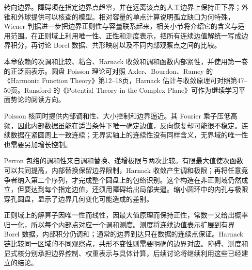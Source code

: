 \ProseParagraphBreak
{}转向边界。障碍须在指定边界点趋零，并在远离该点的人工边界上保持正下界；外锥和外球提供可以核查的模型。相对容量的单点计算说明孤立缺口为何特殊，Wiener 判据进一步把边界正则性与容量联系起来，相关小节将介绍它的含义与适用范围。在正则域上利用唯一性、正性和测度表示，把所有连续边值解统一写成边界积分，再讨论 Borel 数据、共形映射以及不同内部观察点之间的比较。

\ProseParagraphBreak
本章依赖的次调和比较、粘合、Harnack 收敛和调和函数内部紧性，并使用第一卷的正泛函表示。圆盘 Poisson 理论可对照 Axler、Bourdon、Ramey 的《Harmonic Function Theory》\cite{Axler2001Harmonic}第12--18页，Harnack 估计与收敛原理可对照第47--50页。Ransford 的《Potential Theory in the Complex Plane》\cite{Ransford1995Potential}可作为继续学习平面势论的阅读方向。






\begin{chaptersummary}
Poisson 核同时提供内部调和性、大小控制和边界逼近。其 Fourier 乘子压低高频，因此内部数据虽能在适当条件下唯一确定边值，反向恢复却可能很不稳定。连续数据在紧圆周上一致连续；无界实轴上的连续性没有同样含义，无界域的唯一性也需要另加增长控制。

\ProseParagraphBreak
Perron 包络的调和性来自调和替换、递增极限与两次比较。有限最大值使次函数可以共同提高，内部替换保留边界限制，Harnack 收敛产生调和极限；再将任意竞争者纳入第二个序列，才完成整个圆盘上的包络识别。这个构造在非正则域仍然成立，但要达到每个指定边值，还须用障碍给出局部夹逼。缩小圆环中的内孔与极限穿孔圆盘，显示了边界几何变化可能造成的差别。

\ProseParagraphBreak
正则域上的解算子因唯一性而线性，因最大值原理而保持正性，常数一又给出概率归一化，所以每个内部点对应一个调和测度。测度将连续边值表示扩展到有界 Borel 数据，内部积分仍调和；通常的边界到达只在数据的连续点保证。Harnack 链比较同一区域的不同观察点，共形不变性则需要明确的边界对应。障碍、测度和显式核分别承担边界控制、权重表示与具体计算，后续讨论将继续利用这些已经建立的结论。
\end{chaptersummary}

\BookExercises

